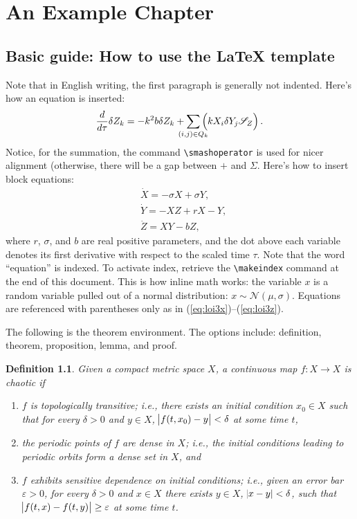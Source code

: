 \documentclass[twoside,phd,4x6]{snuthesis}
\theoremstyle{newdef}
\newtheorem{definition}{Definition}[chapter]
\theoremstyle{slthm}
\begin{document}

\chapter[An Example Chapter]{An Example Chapter}\label{ch:example}

\section{Basic guide: How to use the {\LaTeX} template}
Note that in English writing, the first paragraph is generally not indented. Here's how an equation is inserted: \begin{equation} \frac{d}{d\tau}\delta Z_{k} = -k^{2}b\delta Z_{k} + \smashoperator{\sum_{(i,j)\in Q_{k}}}\left(k X_{i}\delta Y_{j}\mathscr{S}_{Z}\vphantom{\sqrt{2}}\right).
\end{equation} Notice, for the summation, the command \verb|\smashoperator| is used for nicer alignment (otherwise, there will be a gap between $+$ and $\Sigma$. Here's how to insert block equations: \begin{align}
&\dot{X} = -\sigma X+\sigma Y,\label{eq:loi3x}\\
&\dot{Y} = -XZ + rX - Y,\label{eq:loi3y}\\
&\dot{Z} = XY - bZ,\label{eq:loi3z}
\end{align} where $r$, $\sigma$, and $b$ are real positive parameters, and the dot above each variable denotes its first derivative with respect to the scaled time $\tau$. Note that the word ``equation'' is indexed. To activate index, retrieve the \verb|\makeindex| command at the end of this document. This is how inline math works: the variable $x$ is a random variable pulled out of a normal distribution: $x\sim\mathscr{N}(\mu,\sigma)$. Equations are referenced with parentheses only as in (\ref{eq:loi3x})--(\ref{eq:loi3z}).

The following is the theorem environment. The options include: definition, theorem, proposition, lemma, and proof.
\begin{definition}\label{def:chaos}
	Given a compact metric space $X$, a continuous map $f:X\rightarrow X$ is \emph{chaotic} if
	\begin{enumerate}
		\item $f$ is topologically transitive; i.e., there exists an initial condition $x_{0}\in X$ such that for every $\delta > 0$ and $y\in X$, $\abs{f(t,x_{0})-y}<\delta$ at some time $t$,
		\item the periodic points of $f$ are dense in $X$; i.e., the initial conditions leading to periodic orbits form a dense set in $X$, and
		\item $f$ exhibits sensitive dependence on initial conditions; i.e., given an error bar $\varepsilon>0$, for every $\delta > 0$ and $x\in X$ there exists $y\in X$, $\abs{x-y}<\delta$, such that $\abs{f(t,x)-f(t,y)}\geq\varepsilon$ at some time $t$.
	\end{enumerate}
\end{definition}
\end{document}
